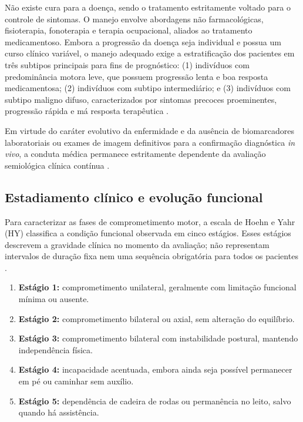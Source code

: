 Não existe cura para a doença, sendo o tratamento estritamente voltado para o controle de sintomas. O manejo envolve abordagens não farmacológicas, fisioterapia, fonoterapia e terapia ocupacional, aliados ao tratamento medicamentoso. Embora a progressão da doença seja individual e possua um curso clínico variável, o manejo adequado exige a estratificação dos pacientes em três subtipos principais para fins de prognóstico: (1) indivíduos com predominância motora leve, que possuem progressão lenta e boa resposta medicamentosa; (2) indivíduos com subtipo intermediário; e (3) indivíduos com subtipo maligno difuso, caracterizados por sintomas precoces proeminentes, progressão rápida e má resposta terapêutica \cite{brasil2025}.

Em virtude do caráter evolutivo da enfermidade e da ausência de biomarcadores laboratoriais ou exames de imagem definitivos para a confirmação diagnóstica \textit{in vivo}, a conduta médica permanece estritamente dependente da avaliação semiológica clínica contínua \cite{Lima2023, Cabreira2019}.


\subsection{Estadiamento clínico e evolução funcional}
\label{subsec:estadiamento-clinico}

Para caracterizar as fases de comprometimento motor, a escala de Hoehn e Yahr (HY) classifica a condição funcional observada em cinco estágios. Esses estágios descrevem a gravidade clínica no momento da avaliação; não representam intervalos de duração fixa nem uma sequência obrigatória para todos os pacientes \cite{Goetz2004HY}.

\begin{enumerate}
    \item \textbf{Estágio 1:} comprometimento unilateral, geralmente com limitação funcional mínima ou ausente.
    \item \textbf{Estágio 2:} comprometimento bilateral ou axial, sem alteração do equilíbrio.
    \item \textbf{Estágio 3:} comprometimento bilateral com instabilidade postural, mantendo independência física.
    \item \textbf{Estágio 4:} incapacidade acentuada, embora ainda seja possível permanecer em pé ou caminhar sem auxílio.
    \item \textbf{Estágio 5:} dependência de cadeira de rodas ou permanência no leito, salvo quando há assistência.
\end{enumerate}

